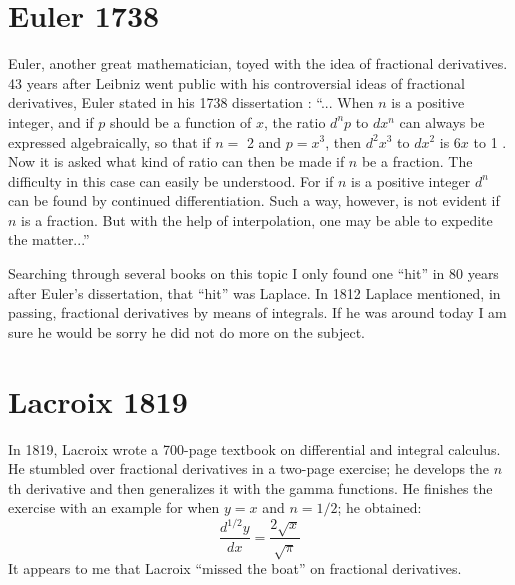 \documentclass[a4paper,14pt,oneside]{book}
\theoremstyle{plain}
\theoremstyle{definition}
\theoremstyle{remark}
\begin{document}
\section{Euler 1738}
         \begin{center}
         \begin{flushleft} 
         \justify
         \Large{
\par{Euler, another great mathematician, toyed with the idea of fractional derivatives. 43 years after Leibniz went public with his controversial ideas of fractional derivatives,
Euler stated in his 1738 dissertation \cite{bb3} : \enquote{... When $n$ is a positive integer, and if $p$ should be a function of $x$, the ratio $d^{n} p$ to $d x^{n}$ can always be expressed algebraically, so that if $n=$ 2 and $p=x^{3}$, then $d^{2} x^{3}$ to $d x^{2}$ is $6x$ to 1 . Now it is asked what kind of ratio can then be made if $n$ be a fraction. The difficulty in this case can easily be understood. For if $n$ is a positive integer $d^{n}$ can be found by continued differentiation. Such a way, however, is not evident if $n$ is a fraction. But with the help of interpolation, one may be able to expedite the matter...}}
\par{Searching through several books on this topic I only found one \enquote{hit} in 80 years after Euler's dissertation, that \enquote{hit} was Laplace. In 1812 Laplace mentioned, in passing, fractional derivatives by means of integrals. If he was around today I am sure he would be sorry he did not do more on the subject.}}
\end{flushleft}        \end{center}

         \section{Lacroix 1819}
         \begin{center}
         \begin{flushleft} 
         \justify
         \Large{
\par{In 1819, Lacroix wrote a 700-page textbook on differential and integral calculus. He stumbled over fractional derivatives in a two-page exercise; he develops the $n$th derivative and then generalizes it with the gamma functions. He finishes the exercise with an example for when $y=x$ and $n=1 / 2$; he obtained:$$
\frac{d^{1 / 2} y}{d x}=\frac{2 \sqrt{x}}{\sqrt{\pi}}
$$It appears to me that Lacroix \enquote{missed the boat} on fractional derivatives. }}
\end{flushleft}        \end{center}
\end{document}
